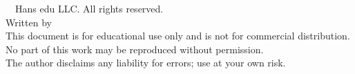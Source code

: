 \begin{center}
  {\small \textcopyright\ \the\year\ Hans edu LLC. All rights reserved.}\\[0.5cm]
  {\small Written by \BookAuthor}\\[0.5cm]
  {\small This document is for educational use only and is not for commercial distribution.}\\[0.5cm]
  {\small No part of this work may be reproduced without permission.}\\[0.5cm]
  {\small The author disclaims any liability for errors; use at your own risk.}
\end{center}


